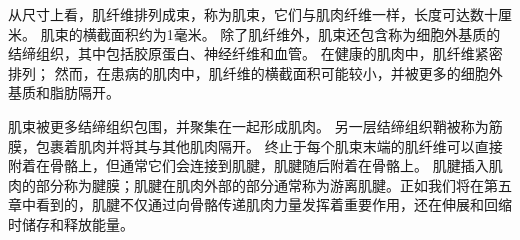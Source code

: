从尺寸上看，肌纤维排列成束，称为肌束，它们与肌肉纤维一样，长度可达数十厘米。
肌束的横截面积约为1毫米。
除了肌纤维外，肌束还包含称为细胞外基质的结缔组织，其中包括胶原蛋白、神经纤维和血管。
在健康的肌肉中，肌纤维紧密排列；
然而，在患病的肌肉中，肌纤维的横截面积可能较小，并被更多的细胞外基质和脂肪隔开。


肌束被更多结缔组织包围，并聚集在一起形成肌肉。
另一层结缔组织鞘被称为筋膜，包裹着肌肉并将其与其他肌肉隔开。
终止于每个肌束末端的肌纤维可以直接附着在骨骼上，但通常它们会连接到肌腱，肌腱随后附着在骨骼上。
肌腱插入肌肉的部分称为腱膜；肌腱在肌肉外部的部分通常称为游离肌腱。正如我们将在第五章中看到的，肌腱不仅通过向骨骼传递肌肉力量发挥着重要作用，还在伸展和回缩时储存和释放能量。




